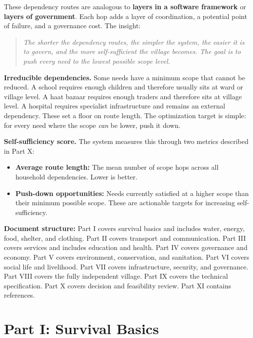 \documentclass[11pt,a4paper]{article}
\begin{document}
These dependency routes are analogous to \textbf{layers in a software framework} or \textbf{layers of government}. Each hop adds a layer of coordination, 
a potential point of failure, and a governance cost. The insight:

\begin{quote}
\textit{The shorter the dependency routes, the simpler the system, the easier it is to govern, and the more self-sufficient the village becomes. 
The goal is to push every need to the lowest possible scope level.}
\end{quote}

\textbf{Irreducible dependencies.} Some needs have a minimum scope that cannot be reduced. A school requires enough children and therefore usually 
sits at ward or village level. A haat bazaar requires enough traders and therefore sits at village level. A hospital requires specialist infrastructure 
and remains an external dependency. These set a floor on route length. The optimization target is simple: for every need where the scope \textit{can} be lower, push it down.

\textbf{Self-sufficiency score.} The system measures this through two metrics described in Part X:
\begin{itemize}
    \item \textbf{Average route length:} The mean number of scope hops across all household dependencies. Lower is better.
    \item \textbf{Push-down opportunities:} Needs currently satisfied at a higher scope than their minimum possible scope. These are actionable 
    targets for increasing self-sufficiency.
\end{itemize}

\textbf{Document structure:} Part I covers survival basics and includes water, energy, food, shelter, and clothing. Part II covers transport 
and communication. Part III covers services and includes education and health. Part IV covers governance and economy. Part V covers environment, 
conservation, and sanitation. Part VI covers social life and livelihood. Part VII covers infrastructure, security, and governance. 
Part VIII covers the fully independent village. Part IX covers the technical specification. Part X covers decision and feasibility review. Part XI contains references.

\part{Part I: Survival Basics}
\end{document}
